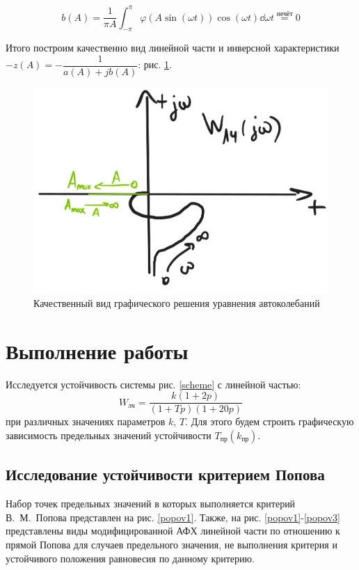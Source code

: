 	\begin{equation*}
		b(A) = \frac{1}{\pi A} \int_{-\pi}^\pi \varphi(A\sin{(\omega t)})\cos{(\omega t)}\dd{\omega t} \stackrel{\text{нечёт}}{=} 0
	\end{equation*}
	
	Итого построим качественно вид линейной части и инверсной характеристики $-z(A) = -\dfrac{1}{a(A)+jb(A)}$: рис. \ref{schematichno}.
	
	\begin{figure}[h]
		\centering\includegraphics[width=.6\textwidth]{png/схематично.jpg}
		\caption{Качественный вид графического решения уравнения автоколебаний}
		\label{schematichno}
	\end{figure}
	
	\section{Выполнение работы}
	
	Исследуется устойчивость системы рис. \ref{scheme} с линейной частью:
	\begin{equation*}
		W_\text{лч} = \frac{k(1+2p)}{(1+Tp)(1+20p)}
	\end{equation*} 
	при различных значениях параметров $k,\,T$. Для этого будем строить графическую зависимость предельных значений устойчивости $T_\text{пр}(k_\text{пр})$.
	
	\subsection{Исследование устойчивости критерием Попова}
	
	Набор точек предельных значений в которых выполняется критерий В.~М.~Попова представлен на рис. \ref{popov1}. Также, на рис. \ref{popov1}-\ref{popov3} представлены виды модифицированной АФХ линейной части по отношению к прямой Попова для случаев предельного значения, не выполнения критерия и устойчивого положения равновесия по данному критерию.
	
